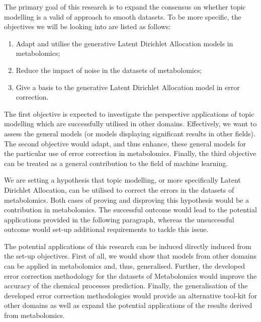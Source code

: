 \documentclass{mprop}
\begin{document}
\par The primary goal of this research is to expand the consensus on whether topic modelling is a valid of approach to smooth datasets. To be more specific, the objectives we will be looking into are listed as follows:
\begin{enumerate}
    \item Adapt and utilise the generative Latent Dirichlet Allocation models in metabolomics;
    \item Reduce the impact of noise in the datasets of metabolomics;
    \item Give a basis to the generative Latent Dirichlet Allocation model in error correction.
\end{enumerate}
The first objective is expected to investigate the perspective applications of topic modelling which are successfully utilised in other domains. Effectively, we want to assess the general models (or models displaying significant results in other fields). The second objective would adapt, and thus enhance, these general models for the particular use of error correction in metabolomics. Finally, the third objective can be treated as a general contribution to the field of machine learning. 

\par We are setting a hypothesis that topic modelling, or more specifically Latent Dirichlet Allocation, can be utilised to correct the errors in the datasets of metabolomics. Both cases of proving and disproving this hypothesis would be a contribution in metabolomics. The successful outcome would lead to the potential applications provided in the following paragraph, whereas the unsuccessful outcome would set-up additional requirements to tackle this issue.

\par The potential applications of this research can be induced directly induced from the set-up objectives. First of all, we would show that models from other domains can be applied in metabolomics and, thus, generalised. Further, the developed error correction methodology for the datasets of Metabolomics would improve the accuracy of the chemical processes prediction. Finally, the generalisation of the developed error correction methodologies would provide an alternative tool-kit for other domains as well as expand the potential applications of the results derived from metabolomics. 
\end{document}
